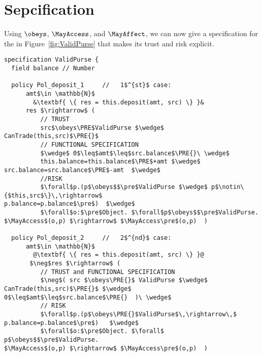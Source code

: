 \section{Sepcification  }



Using $\obeys$, $\MayAccess$, and $\MayAffect$, we can now give a
specification for the  in Figure~\ref{fig:ValidPurse} that
makes its trust and risk explicit.

\begin{figure*}[hbt]
\begin{lstlisting}[escapechar=&]
specification ValidPurse {
  field balance // Number

  policy Pol_deposit_1     //   1$^{st}$ case:
      amt$\in \mathbb{N}$
        &\textbf{ \{ res = this.deposit(amt, src) \} }&
      res $\rightarrow$ (
          // TRUST
          src$\obeys\PRE$ValidPurse $\wedge$ CanTrade(this,src)$\PRE{}$
          // FUNCTIONAL SPECIFICATION
          $\wedge$ 0$\leq$amt$\leq$src.balance$\PRE{}\ \wedge$
          this.balance=this.balance$\PRE$+amt $\wedge$                                  src.balance=src.balance$\PRE$-amt  $\wedge$
          //RISK
          $\forall$p.(p$\obeys$$\pre$ValidPurse $\wedge$ p$\notin\{$this,src$\}\,\rightarrow$                            p.balance=p.balance$\pre$)  $\wedge$
          $\forall$o:$\pre$Object. $\forall$p$\obeys$$\pre$ValidPurse.                                  $\MayAccess$(o,p) $\rightarrow$ $\MayAccess\pre$(o,p)  )

  policy Pol_deposit_2     //   2$^{nd}$ case:
      amt$\in \mathbb{N}$
        @\textbf{ \{ res = this.deposit(amt, src) \} }@
       $\neg$res $\rightarrow$ (
          // TRUST and FUNCTIONAL SPECIFICATION
          $\neg$( src $\obeys\PRE{}$ ValidPurse $\wedge$ CanTrade(this,src)$\PRE{}$ $\wedge$                 0$\leq$amt$\leq$src.balance$\PRE{}  )\ \wedge$
          // RISK
          $\forall$p.(p$\obeys\PRE{}$ValidPurse$\,\rightarrow\,$ p.balance=p.balance$\pre$)   $\wedge$
          $\forall$o:$\pre$Object. $\forall$ p$\obeys$$\pre$ValidPurse.                                  $\MayAccess$(o,p) $\rightarrow$ $\MayAccess\pre$(o,p)  )
\end{lstlisting}
\vspace*{-7mm}
\caption{ specification}
\label{fig:ValidPurse}
\end{figure*}
%
\addtocounter{figure}{-1}
%
